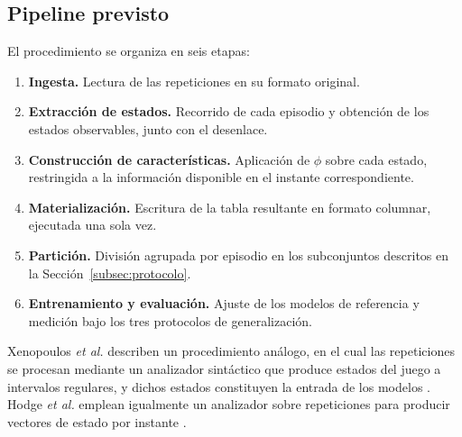 
\subsection{Pipeline previsto}
\label{subsec:pipeline}

El procedimiento se organiza en seis etapas:

\begin{enumerate}
  \item \textbf{Ingesta.} Lectura de las repeticiones en su formato
        original.
  \item \textbf{Extracción de estados.} Recorrido de cada episodio y
        obtención de los estados observables, junto con el desenlace.
  \item \textbf{Construcción de características.} Aplicación de $\phi$
        sobre cada estado, restringida a la información disponible en el
        instante correspondiente.
  \item \textbf{Materialización.} Escritura de la tabla resultante en
        formato columnar, ejecutada una sola vez.
  \item \textbf{Partición.} División agrupada por episodio en los
        subconjuntos descritos en la Sección~\ref{subsec:protocolo}.
  \item \textbf{Entrenamiento y evaluación.} Ajuste de los modelos de
        referencia y medición bajo los tres protocolos de generalización.
\end{enumerate}

Xenopoulos \textit{et al.} describen un procedimiento análogo, en el cual
las repeticiones se procesan mediante un analizador sintáctico que produce
estados del juego a intervalos regulares, y dichos estados constituyen la
entrada de los modelos \cite{xenopoulos_winprob_2022}. Hodge \textit{et al.}
emplean igualmente un analizador sobre repeticiones para producir vectores
de estado por instante \cite{hodge_winprediction_2021}.


